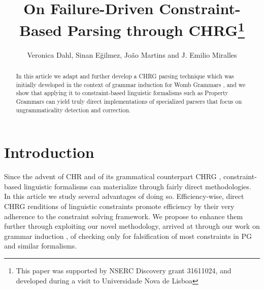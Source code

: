 \documentclass{llncs}
\begin{document}
%
%
\mainmatter              %
%
\title{On Failure-Driven Constraint-Based Parsing through CHRG\thanks{This paper was supported by NSERC  Discovery grant 31611024, and developed during a visit to Universidade Nova de Lisboa}}
%
%
\author{Veronica Dahl, Sinan Eğilmez, João Martins and J. Emilio Miralles}
%
%
%
\maketitle              %


\begin{abstract}

In this article we adapt and further develop  a CHRG parsing technique which was initially developed in the context of grammar induction for Womb Grammars \cite{DM12}, and we show that applying it to constraint-based linguistic formalisms such as Property Grammars \cite{Blache} can yield truly direct implementations of specialized parsers that focus on ungrammaticality detection and correction.

\end{abstract}
%

\section{Introduction}
% 

Since the advent of CHR \cite{Fruhwirth98} and of its grammatical counterpart CHRG \cite{Christiansen01}, constraint-based linguistic formalisms can materialize through fairly direct meth\-odologies.   In this article we study several advantages of doing so. Efficiency-wise, direct CHRG renditions of linguistic constraints promote efficiency by their very adherence to  the constraint solving framework. We propose to enhance them further through exploiting our novel  methodology, arrived at through our work on grammar induction \cite{DM12}, of  checking only for falsification of most constraints in PG \cite{Blache} and similar formalisms.
%  
\end{document}
